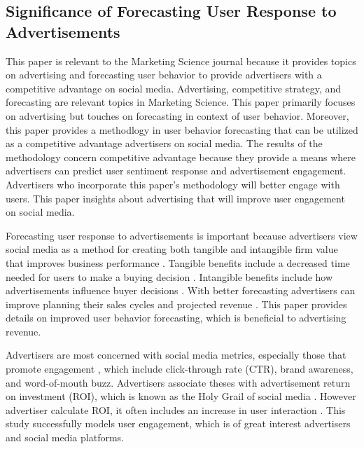 \documentclass{article}
\begin{document}
\subsection{Significance of Forecasting User Response to Advertisements}

This paper is relevant to the Marketing Science journal because it provides topics on advertising and forecasting user behavior to provide advertisers with a competitive advantage on social media. Advertising, competitive strategy, and forecasting are relevant topics in Marketing Science. This paper primarily focuses on advertising but touches on forecasting in context of user behavior. Moreover, this paper provides a methodlogy in user behavior forecasting that can be utilized as a competitive advantage advertisers on social media.  The results of the methodology concern competitive advantage because they provide a means where advertisers can predict user sentiment response and advertisement engagement. Advertisers who incorporate this paper's methodology will better engage with users. This paper insights about advertising that will improve user engagement on social media.

Forecasting user response to advertisements is important because advertisers view social media as a method for creating both tangible and intangible firm value that improves business performance \cite{Authors2013}. Tangible benefits include a decreased time needed for users to make a buying decision \cite{Authors2013}. Intangible benefits include how advertisements influence buyer decisions \cite{Authors2013}. With better forecasting advertisers can improve planning their sales cycles and projected revenue \cite{Imsa2020}. This paper provides details on improved user behavior forecasting, which is beneficial to advertising revenue. 

Advertisers are most concerned with social media metrics, especially those that promote engagement \cite{Tiago2014}, which include click-through rate (CTR), brand awareness, and word-of-mouth buzz. Advertisers associate theses with advertisement return on investment (ROI), which is known as the Holy Grail of social media \cite{Fisher2009}. However advertiser calculate ROI, it often includes an increase in user interaction \cite{Romero2011, Schacht2015}. This study successfully models user engagement, which is of great interest advertisers and social media platforms.  
\end{document}
